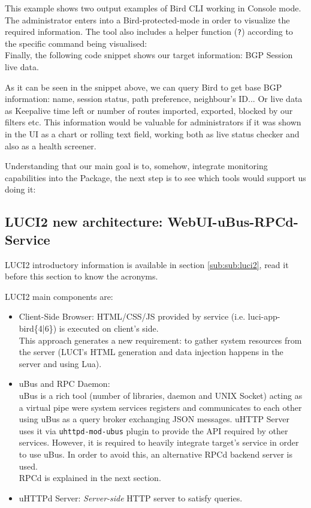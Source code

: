 This example shows two output examples of Bird CLI working in Console mode. The administrator enters into a Bird-protected-mode in order to visualize the required information. The tool also includes a helper function (\texttt{?}) according to the specific command being visualised:\\



Finally, the following code snippet shows our target information: BGP Session live data.



As it can be seen in the snippet above, we can query Bird to get base BGP information: name, session status, path preference, neighbour's ID... Or live data as Keepalive time left or number of routes imported, exported, blocked by our filters etc. This information would be valuable for administrators if it was shown in the UI as a chart or rolling text field, working both as live status checker and also as a health screener.

Understanding that our main goal is to, somehow, integrate monitoring capabilities into the Package, the next step is to see which tools would support us doing it:

\subsection{LUCI2 new architecture: WebUI-uBus-RPCd-Service}
LUCI2 introductory information is available in section \ref{sub:sub:luci2}, read it before this section to know the acronyms.

LUCI2 main components are: 

\begin{itemize}
    \item Client-Side Browser: HTML/CSS/JS provided by service (i.e. luci-app-bird\{4|6\}) is executed on client's side.\\
    This approach generates a new requirement: to gather system resources from the server (LUCI's HTML generation and data injection happens in the server and using Lua).
    \item uBus and RPC Daemon:\\
    uBus is a rich tool (number of libraries, daemon and UNIX Socket) acting as a virtual pipe were system services registers and communicates to each other using uBus as a query broker exchanging JSON messages. uHTTP Server uses it via \texttt{uhttpd-mod-ubus} plugin to provide the API required by other services. However, it is required to heavily integrate target's service in order to use uBus. In order to avoid this, an alternative RPCd backend server is used.\\ RPCd is explained in the next section.
    \item uHTTPd Server: \textit{Server-side} HTTP server to satisfy queries.
\end{itemize}

